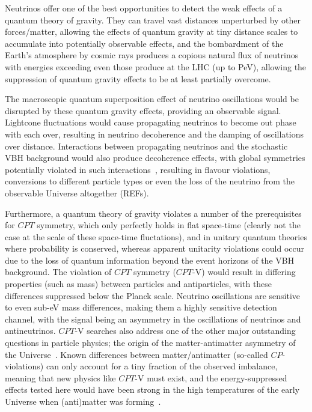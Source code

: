 \documentclass[a4paper,11pt]{article}
\newcounter{bar}
\begin{document}
Neutrinos offer one of the best opportunities to detect the weak effects of a quantum theory of gravity. They can travel vast distances unperturbed by other forces/matter, allowing the effects of quantum gravity at tiny distance scales to accumulate into potentially observable effects, and the bombardment of the Earth's atmosphere by cosmic rays produces a copious natural flux of neutrinos with energies exceeding even those produce at the LHC (up to PeV), allowing the suppression of quantum gravity effects to be at least partially overcome. 

The macroscopic quantum superposition effect of neutrino oscillations would be disrupted by these quantum gravity effects, providing an observable signal. Lightcone fluctuations would cause propagating neutrinos to become out phase with each over, resulting in neutrino decoherence and the damping of oscillations over distance. Interactions between propagating neutrinos and the stochastic VBH background would also produce decoherence effects, with global symmetries potentially violated in such interactions~\cite{Anchordoqui:2005gj, PhysRevD.102.115003, Hellmann:2021jyz}, resulting in flavour violations, conversions to different particle types or even the loss of the neutrino from the observable Universe altogether (REFs).

Furthermore, a quantum theory of gravity violates a number of the prerequisites for $CPT$ symmetry, which only perfectly holds in flat space-time (clearly not the case at the scale of these space-time fluctations), and in unitary quantum theories where probability is conserved, whereas apparent unitarity violations could occur due to the loss of quantum information beyond the event horizons of the VBH background. The violation of $CPT$ symmetry ($CPT$-V) would result in differing properties (such as mass) between particles and antiparticles, with these differences suppressed below the Planck scale. Neutrino oscillations are sensitive to even sub-eV mass differences, making them a highly sensitive detection channel, with the signal being an asymmetry in the oscillations of neutrinos and antineutrinos. $CPT$-V searches also address one of the other major outstanding questions in particle physics; the origin of the matter-antimatter asymmetry of the Universe~\cite{Sakharov_1991}. Known differences between matter/antimatter (so-called $CP$-violations) can only account for a tiny fraction of the observed imbalance, meaning that new physics like $CPT$-V must exist, and the energy-suppressed effects tested here would have been strong in the high temperatures of the early Universe when (anti)matter was forming~\cite{Mavromatos:2017cxr, hep-ph/9809542, Ellis:2013gca}. \\
\end{document}
